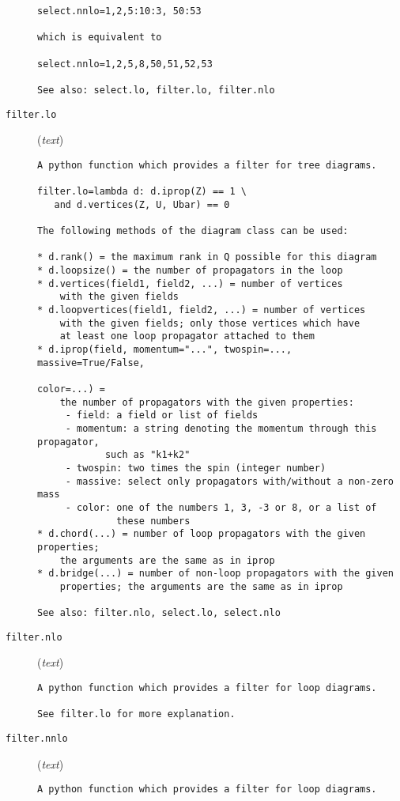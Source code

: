 \begin{description}
\begin{verbatim}
select.nnlo=1,2,5:10:3, 50:53

which is equivalent to

select.nnlo=1,2,5,8,50,51,52,53

See also: select.lo, filter.lo, filter.nlo
\end{verbatim}
\item[\texttt{filter.lo}] (\textit{text})
\begin{verbatim}
A python function which provides a filter for tree diagrams.

filter.lo=lambda d: d.iprop(Z) == 1 \
   and d.vertices(Z, U, Ubar) == 0

The following methods of the diagram class can be used:

* d.rank() = the maximum rank in Q possible for this diagram
* d.loopsize() = the number of propagators in the loop
* d.vertices(field1, field2, ...) = number of vertices
    with the given fields
* d.loopvertices(field1, field2, ...) = number of vertices
    with the given fields; only those vertices which have
    at least one loop propagator attached to them
* d.iprop(field, momentum="...", twospin=..., massive=True/False,
                                                         color=...) =
    the number of propagators with the given properties:
     - field: a field or list of fields
     - momentum: a string denoting the momentum through this propagator,
            such as "k1+k2"
     - twospin: two times the spin (integer number)
     - massive: select only propagators with/without a non-zero mass
     - color: one of the numbers 1, 3, -3 or 8, or a list of
              these numbers
* d.chord(...) = number of loop propagators with the given properties;
    the arguments are the same as in iprop
* d.bridge(...) = number of non-loop propagators with the given
    properties; the arguments are the same as in iprop

See also: filter.nlo, select.lo, select.nlo
\end{verbatim}
\item[\texttt{filter.nlo}] (\textit{text})
\begin{verbatim}
A python function which provides a filter for loop diagrams.

See filter.lo for more explanation.
\end{verbatim}
\item[\texttt{filter.nnlo}] (\textit{text})
\begin{verbatim}
A python function which provides a filter for loop diagrams.


\end{verbatim}
\end{description}
